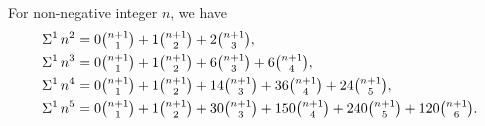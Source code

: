 \begin{example} For non-negative integer $n$, we have
  \begin{align*}
    \Sigma^{1}\,{n}^{2} &= 0 \tbinom{n+1}{1} + 1 \tbinom{n+1}{2}
    + 2  \tbinom{n+1}{3},
    \\
    \Sigma^{1}\,{n}^{3} &= 0 \tbinom{n+1}{1} + 1 \tbinom{n+1}{2}
    + 6  \tbinom{n+1}{3} + 6   \tbinom{n+1}{4},
    \\
    \Sigma^{1}\,{n}^{4} &= 0 \tbinom{n+1}{1} + 1 \tbinom{n+1}{2}
    + 14 \tbinom{n+1}{3} + 36  \tbinom{n+1}{4} + 24  \tbinom{n+1}{5},
    \\
    \Sigma^{1}\,{n}^{5} &= 0 \tbinom{n+1}{1} + 1 \tbinom{n+1}{2}
    + 30 \tbinom{n+1}{3} + 150 \tbinom{n+1}{4} + 240 \tbinom{n+1}{5}
    + 120 \tbinom{n+1}{6}.
  \end{align*}
\end{example}
